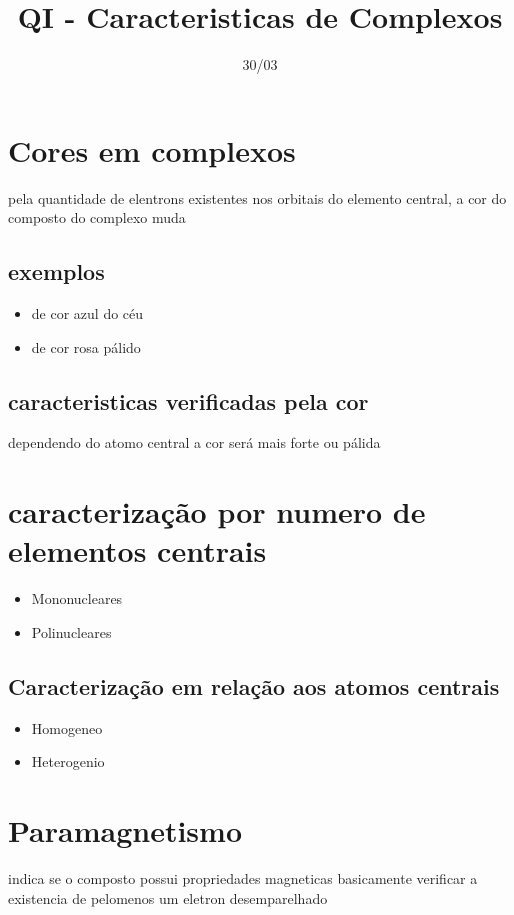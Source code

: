 \documentclass[12pt]{article}
\begin{document}
\title{QI - Caracteristicas de Complexos}
\date{30/03}

\maketitle
\tableofcontents
\break

\section{Cores em complexos}
pela quantidade de elentrons existentes nos orbitais do elemento central, a cor do composto do complexo muda
\subsection{exemplos}
\begin{itemize}
\item {} de cor azul do céu
\item {} de cor rosa pálido
\end{itemize}

\subsection{caracteristicas verificadas pela cor}
dependendo do atomo central a cor será mais forte ou pálida


\section{caracterização por numero de elementos centrais}

\begin{itemize}
\item Mononucleares
\item Polinucleares
\end{itemize}

\subsection{Caracterização em relação aos atomos centrais}
\begin{itemize}
\item Homogeneo
\item Heterogenio
\end{itemize}

\section{Paramagnetismo}
indica se o composto possui propriedades magneticas
basicamente verificar a existencia de pelomenos um eletron desemparelhado
\end{document}
